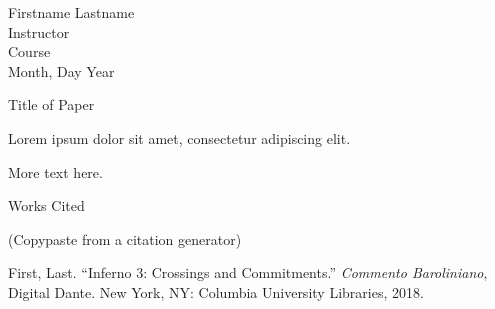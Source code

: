 \documentclass[12pt]{article}
\newcommand{\bibent}{\noindent \hangindent 40pt}
\newenvironment{workscited}
{
\newpage
\begin{center}
    Works Cited
\end{center}
}
{\newpage}
\begin{document}
    \begin{flushleft}

        Firstname Lastname\\
        Instructor\\
        Course\\
        Month, Day Year\\

        \begin{center}
            Title of Paper
        \end{center}

        \setlength{\parindent}{0.5in}


        Lorem ipsum dolor sit amet, consectetur adipiscing elit.

        More text here.


        \newpage

        \begin{workscited}

            \bibent
            (Copypaste from a citation generator)

            \bibent
            First, Last. %
            “Inferno 3: Crossings and Commitments.” %
            \textit{Commento Baroliniano}, Digital Dante. %
            New York, NY: Columbia University Libraries, 2018. %

        \end{workscited}
    \end{flushleft}
\end{document}
